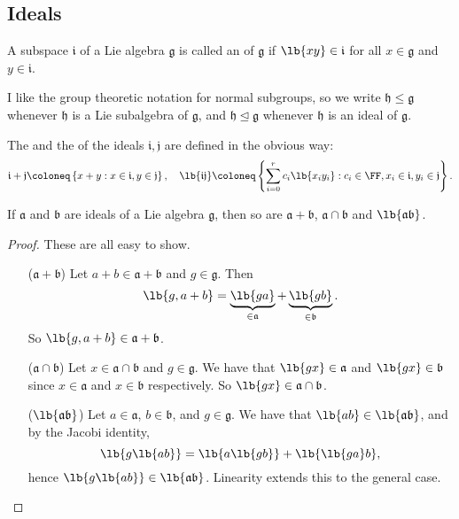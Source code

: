 \documentclass{article}
\newcommand*\tleq{\ensuremath{\mathrel{\unlhd}}}
\DeclarePairedDelimiter\lb\lbrack\rbrack
\newcommand*\frka{{\ensuremath{\mathfrak{a}}}}
\newcommand*\frkb{{\ensuremath{\mathfrak{b}}}}
\newcommand*\frkg{{\ensuremath{\mathfrak{g}}}}
\newcommand*\frkh{{\ensuremath{\mathfrak{h}}}}
\newcommand*\frki{{\ensuremath{\mathfrak{i}}}}
\newcommand*\frkj{{\ensuremath{\mathfrak{j}}}}
\begin{document}
\subsection{Ideals}

\begin{definition}
    A subspace $\frki$ of a Lie algebra $\frkg$ is called an  of $\frkg$ if $\lb{xy} \in \frki$ for all $x \in \frkg$ and $y \in \frki$.
\end{definition}

\begin{convention}
    I like the group theoretic notation for normal subgroups, so we write $\frkh \leq \frkg$ whenever $\frkh$ is a Lie subalgebra of $\frkg$, and $\frkh \tleq \frkg$ whenever $\frkh$ is an ideal of $\frkg$.
\end{convention}

The  and the  of the ideals $\frki, \frkj$ are defined in the obvious way:
\[
    \frki + \frkj
    \coloneq
    \left\{
        x + y : x \in \frki, y \in \frkj
    \right\},\quad
    \lb{\frki\frkj}
    \coloneq
    \left\{
        \sum_{i=0}^rc_i\lb{x_iy_i}
        :
        c_i \in \FF, x_i \in \frki, y_i \in \frkj
    \right\}.
\]

\begin{theorem}
    If $\frka$ and $\frkb$ are ideals of a Lie algebra $\frkg$, then so are $\frka + \frkb$, $\frka \cap \frkb$ and $\lb{\frka\frkb}$.
\end{theorem}
\begin{proof}
    These are all easy to show.
    \begin{itemize}
        \item[($\frka+\frkb$)]
            Let $a + b \in \frka + \frkb$ and $g \in \frkg$.
            Then
            \[
                \lb{g,a+b}
                =
                \underbrace{
                    \lb{ga}
                }_{\in \frka}
                +
                \underbrace{
                    \lb{gb}
                }_{\in \frkb}.
            \]
            So $\lb{g,a+b} \in \frka+\frkb$.
        \item[($\frka \cap \frkb$)]
            Let $x \in \frka \cap \frkb$ and $g \in \frkg$.
            We have that $\lb{gx} \in \frka$ and $\lb{gx} \in \frkb$ since $x \in \frka$ and $x \in \frkb$ respectively.
            So $\lb{gx} \in \frka \cap \frkb$.
        \item[($\lb{\frka\frkb}$)]
            Let $a \in \frka$, $b \in \frkb$, and $g \in \frkg$.
            We have that $\lb{ab} \in \lb{\frka\frkb}$, and by the Jacobi identity,
            \[
                \lb{g\lb{ab}}
                =
                \lb{a\lb{gb}}
                +
                \lb{\lb{ga}b},
            \]
            hence $\lb{g\lb{ab}} \in \lb{\frka\frkb}$.
            Linearity extends this to the general case.
    \end{itemize}
\end{proof}
\end{document}
